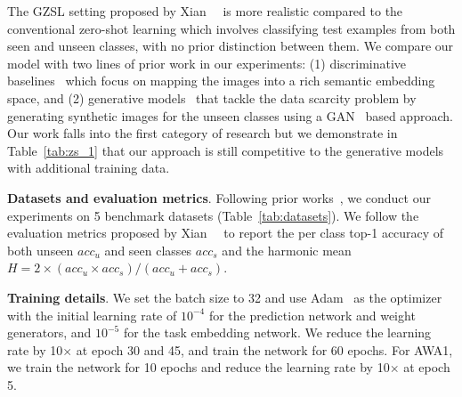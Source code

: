 \documentclass[10pt,twocolumn,letterpaper]{article}
\newcommand{\joey}[1]{\textcolor{blue}{[Joey: #1]}}
\newcommand\minisection[1]{\vspace{2mm}\noindent \textbf{#1}}
\begin{document}
The GZSL setting proposed by Xian~\etal ~\cite{xian2018zero} is more realistic compared to the conventional zero-shot 
learning which involves classifying test examples from both seen and unseen classes, with no
prior distinction between them. We compare our model with 
two lines of prior work in our experiments: (1) discriminative baselines~\cite{zhang2017learning, yang2018learning}%
which focus on mapping the images into a rich semantic embedding space, and (2) generative models~\cite{xian2018feature,verma2017generalized}%
that tackle the data
scarcity problem by generating synthetic images for the unseen classes using a GAN~\cite{goodfellow2014generative, zhu2017unpaired} based
approach. 
Our work falls into the first category of research but we demonstrate in 
Table~\ref{tab:zs_1}
that our approach is still competitive to the generative models with additional training data.

\minisection{Datasets and evaluation metrics}. Following prior works~\cite{zhang2016zero, frome2013devise, akata2016label, akata2015evaluation}, 
we conduct our experiments on 5 benchmark datasets (Table~\ref{tab:datasets}). We follow the evaluation metrics proposed by Xian~\etal~\cite{xian2018zero} to report the per class top-1 accuracy of both unseen $acc_u$ and seen classes $acc_s$ and the harmonic mean $H = 2 \times (acc_u \times acc_s)/(acc_u+acc_s)$. 

\minisection{Training details}. We set the batch size to 32 and use Adam~\cite{kingma2014adam} as
the optimizer with the initial learning rate of $10^{-4}$ for the prediction network and weight generators, and $10^{-5}$ for the task embedding network. 
We reduce the learning rate by 10$\times$ at epoch 30 and 45, and
train the network for 60 epochs. For AWA1, we train the network for 10 epochs and reduce the learning rate by 10$\times$ at epoch 5. 
\end{document}
